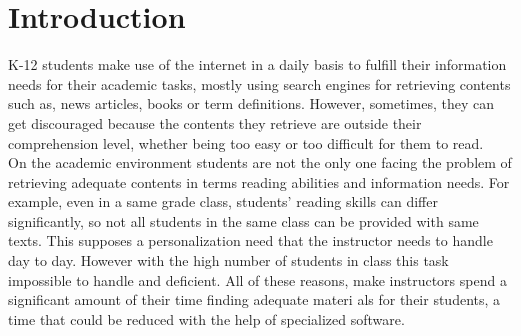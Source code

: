 \documentclass{sig-alternate-05-2015}
\begin{document}


%
%

%
%
\printccsdesc



\section{Introduction}

K-12 students make use of the internet in a daily basis to fulfill their information needs for their academic tasks, mostly using search engines for retrieving contents such as, news articles, books or term definitions. However, sometimes, they can get discouraged because the contents they retrieve are outside their comprehension level, whether being too easy or too difficult  for them to read.\\



On the academic environment students are not the only one facing the problem of retrieving adequate contents in terms reading abilities and information needs. For example, even in a same grade class, students' reading skills can differ significantly, so not all students in the same class can be provided with same texts. This supposes a personalization need that the instructor needs to handle day to day. However with the high number of students in class this task impossible to handle and deficient. All of these reasons, make instructors spend a significant amount of their time finding adequate materi als for their students, a time that could be reduced with the help of specialized software.\\
\end{document}
